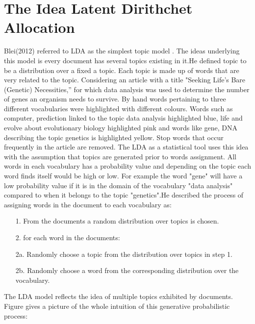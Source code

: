 \section{ The Idea Latent Dirithchet Allocation}
Blei(2012) referred to LDA as the simplest topic model . The ideas underlying this model is every document has several topics existing in it.He defined topic to be a distribution over a fixed a topic.
Each topic is made up of words that are very related to the topic. Considering an article with a title "Seeking Life’s Bare (Genetic) Necessities,” for which data analysis was used to determine the number of genes an organism needs to survive. By hand words pertaining to three different vocabularies were highlighted with different colours. Words such as computer, prediction linked to the topic data analysis highlighted blue, life and evolve about evolutionary biology highlighted pink and words like gene, DNA describing the topic genetics is highlighted yellow.
Stop words that occur frequently in the article are removed. 
The LDA as a statistical tool uses this idea with the assumption that topics are generated prior to words assignment. All words in each vocabulary has a probability value and depending on the topic each word finds itself would be high or low. For example the word "gene" will have a low probability value if it is in the domain of the  vocabulary "data analysis" compared to when it belongs to the topic "genetics".He described the process of assigning words in the document to each 
vocabulary as:
\begin{itemize}
\item[1.] From the documents a random distribution over topics is chosen.
\item[2.] for each word in the documents:
		\item[2a.]Randomly choose a topic from
the distribution over topics in step 1.
		\item[2b.]Randomly choose a word from the
corresponding distribution over
the vocabulary.
\end{itemize}
The LDA model reflects the idea of multiple topics exhibited by documents.
Figure  gives a picture of the whole intuition of this generative probabilistic process:

